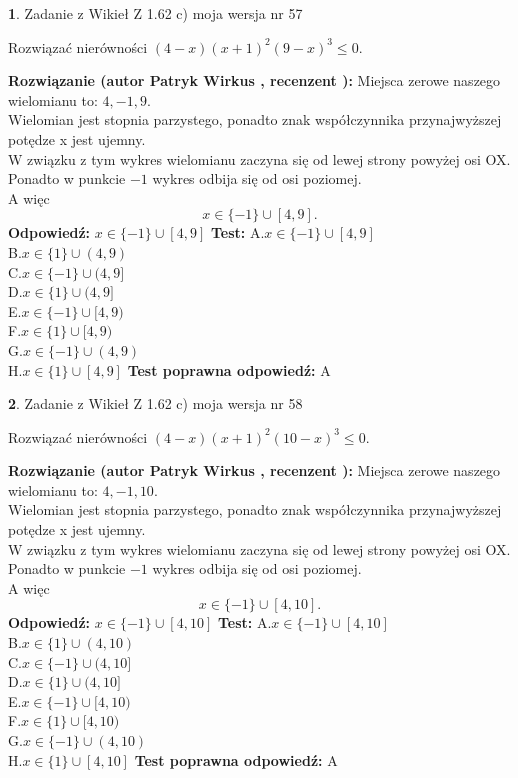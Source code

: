 \documentclass[12pt, a4paper]{article}
\theoremstyle{definition} %
\newtheorem{zad}{}
\newcommand{\zadStart}[1]{\begin{zad}#1\newline}
\newcommand{\zadStop}{\end{zad}}
\newcommand{\rozwStart}[2]{\noindent \textbf{Rozwiązanie (autor #1 , recenzent #2): }\newline}
\newcommand{\rozwStop}{\newline}
\newcommand{\odpStart}{\noindent \textbf{Odpowiedź:}\newline}
\newcommand{\odpStop}{\newline}
\newcommand{\testStart}{\noindent \textbf{Test:}\newline}
\newcommand{\testStop}{\newline}
\newcommand{\kluczStart}{\noindent \textbf{Test poprawna odpowiedź:}\newline}
\newcommand{\kluczStop}{\newline}
\begin{document}
\zadStart{Zadanie z Wikieł Z 1.62 c) moja wersja nr 57}

Rozwiązać nierówności $(4-x)(x+1)^{2}(9-x)^{3}\le0$.
\zadStop
\rozwStart{Patryk Wirkus}{}
Miejsca zerowe naszego wielomianu to: $4, -1, 9$.\\
Wielomian jest stopnia parzystego, ponadto znak współczynnika przy\linebreak najwyższej potędze x jest ujemny.\\ W związku z tym wykres wielomianu zaczyna się od lewej strony powyżej osi OX.\\
Ponadto w punkcie $-1$ wykres odbija się od osi poziomej.\\
A więc $$x \in \{-1\} \cup [4,9].$$
\rozwStop
\odpStart
$x \in \{-1\} \cup [4,9]$
\odpStop
\testStart
A.$x \in \{-1\} \cup [4,9]$\\
B.$x \in \{1\} \cup (4,9)$\\
C.$x \in \{-1\} \cup (4,9]$\\
D.$x \in \{1\} \cup (4,9]$\\
E.$x \in \{-1\} \cup [4,9)$\\
F.$x \in \{1\} \cup [4,9)$\\
G.$x \in \{-1\} \cup (4,9)$\\
H.$x \in \{1\} \cup [4,9]$
\testStop
\kluczStart
A
\kluczStop



\zadStart{Zadanie z Wikieł Z 1.62 c) moja wersja nr 58}

Rozwiązać nierówności $(4-x)(x+1)^{2}(10-x)^{3}\le0$.
\zadStop
\rozwStart{Patryk Wirkus}{}
Miejsca zerowe naszego wielomianu to: $4, -1, 10$.\\
Wielomian jest stopnia parzystego, ponadto znak współczynnika przy\linebreak najwyższej potędze x jest ujemny.\\ W związku z tym wykres wielomianu zaczyna się od lewej strony powyżej osi OX.\\
Ponadto w punkcie $-1$ wykres odbija się od osi poziomej.\\
A więc $$x \in \{-1\} \cup [4,10].$$
\rozwStop
\odpStart
$x \in \{-1\} \cup [4,10]$
\odpStop
\testStart
A.$x \in \{-1\} \cup [4,10]$\\
B.$x \in \{1\} \cup (4,10)$\\
C.$x \in \{-1\} \cup (4,10]$\\
D.$x \in \{1\} \cup (4,10]$\\
E.$x \in \{-1\} \cup [4,10)$\\
F.$x \in \{1\} \cup [4,10)$\\
G.$x \in \{-1\} \cup (4,10)$\\
H.$x \in \{1\} \cup [4,10]$
\testStop
\kluczStart
A
\kluczStop
\end{document}
